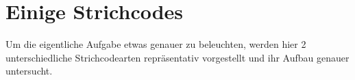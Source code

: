 \section{Einige Strichcodes}
\writtenby{\dcauthornameriren}%
Um die eigentliche Aufgabe etwas genauer zu beleuchten, werden hier 2 unterschiedliche Strichcodearten repräsentativ vorgestellt und ihr Aufbau genauer untersucht.


%
%

